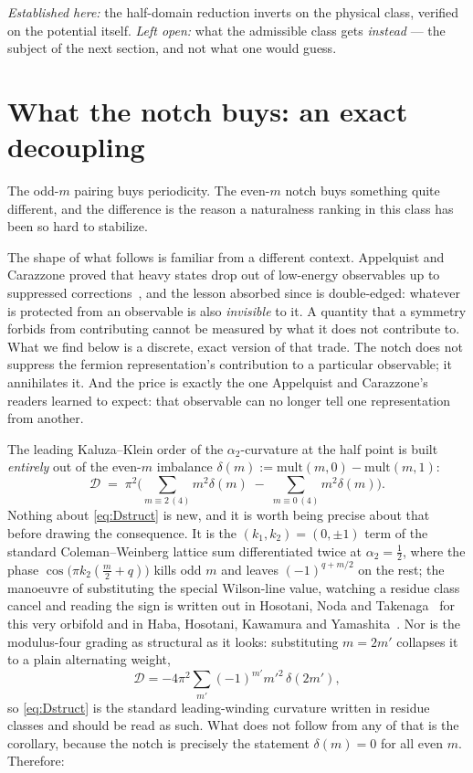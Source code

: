 \documentclass[11pt,a4paper]{article}
\begin{document}
\emph{Established here:} the half-domain reduction inverts on the physical class, verified
on the potential itself. \emph{Left open:} what the admissible class gets \emph{instead} ---
the subject of the next section, and not what one would guess.

\section{What the notch buys: an exact decoupling}\label{sec:decoupling}
The odd-$m$ pairing buys periodicity. The even-$m$ notch buys something quite different, and
the difference is the reason a naturalness ranking in this class has been so hard to
stabilize.

The shape of what follows is familiar from a different context. Appelquist and Carazzone
proved that heavy states drop out of low-energy observables up to suppressed
corrections~\cite{AppelquistCarazzone}, and the lesson absorbed since is double-edged:
whatever is protected from an observable is also \emph{invisible} to it. A quantity that a
symmetry forbids from contributing cannot be measured by what it does not contribute to.
What we find below is a discrete, exact version of that trade. The notch does not suppress
the fermion representation's contribution to a particular observable; it annihilates it. And
the price is exactly the one Appelquist and Carazzone's readers learned to expect: that
observable can no longer tell one representation from another.

The leading Kaluza--Klein order of the $\alpha_2$-curvature at the half point is built
\emph{entirely} out of the even-$m$ imbalance
$\delta(m):=\mathrm{mult}(m,0)-\mathrm{mult}(m,1)$:
\begin{equation}\label{eq:Dstruct}
\mathcal D\;=\;\pi^2\Big(\sum_{m\equiv2\,(4)}m^2\delta(m)\;-\;\sum_{m\equiv0\,(4)}m^2\delta(m)\Big).
\end{equation}
Nothing about \eqref{eq:Dstruct} is new, and it is worth being precise about that before
drawing the consequence. It is the $(k_1,k_2)=(0,\pm1)$ term of the standard Coleman--Weinberg
lattice sum differentiated twice at $\alpha_2=\tfrac12$, where the phase
$\cos\big(\pi k_2(\tfrac m2+q)\big)$ kills odd $m$ and leaves $(-1)^{q+m/2}$ on the rest; the
manoeuvre of substituting the special Wilson-line value, watching a residue class cancel and
reading the sign is written out in Hosotani, Noda and Takenaga~\cite[Eqs.~(6.5)--(6.7)]{HNT}
for this very orbifold and in Haba, Hosotani, Kawamura and
Yamashita~\cite[Eq.~(46)]{HHKY}. Nor is the modulus-four grading as structural as it looks:
substituting $m=2m'$ collapses it to a plain alternating weight,
\[
\mathcal D=-4\pi^2\sum_{m'}(-1)^{m'}m'^2\,\delta(2m'),
\]
so \eqref{eq:Dstruct} is the standard leading-winding curvature written in residue classes and
should be read as such. What does not follow from any of that is the corollary, because the
notch is precisely the statement $\delta(m)=0$ for all even $m$. Therefore:
\end{document}
